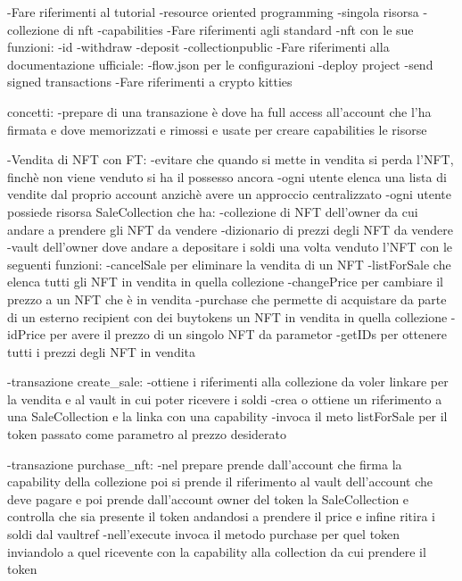 -Fare riferimenti al tutorial
    -resource oriented programming
        -singola risorsa
        -collezione di nft
    -capabilities
-Fare riferimenti agli standard
    -nft con le sue funzioni:
        -id
        -withdraw
        -deposit
        -collectionpublic
-Fare riferimenti alla documentazione ufficiale:
    -flow.json per le configurazioni
    -deploy project
    -send signed transactions
-Fare riferimenti a crypto kitties

concetti:
    -prepare di una transazione è dove ha full access all'account che l'ha firmata e dove 
    memorizzati e rimossi e usate per creare capabilities le risorse

-Vendita di NFT con FT:
    -evitare che quando si mette in vendita si perda l'NFT, finchè non viene venduto si ha il possesso ancora
    -ogni utente elenca una lista di vendite dal proprio account anzichè avere un approccio centralizzato
    -ogni utente possiede risorsa SaleCollection che ha:
        -collezione di NFT dell'owner da cui andare a prendere gli NFT da vendere
        -dizionario di prezzi degli NFT da vendere
        -vault dell'owner dove andare a depositare i soldi una volta venduto l'NFT
        con le seguenti funzioni:
            -cancelSale per eliminare la vendita di un NFT
            -listForSale che elenca tutti gli NFT in vendita in quella collezione
            -changePrice per cambiare il prezzo a un NFT che è in vendita
            -purchase che permette di acquistare da parte di un esterno recipient con dei 
            buytokens un NFT in vendita in quella collezione
            -idPrice per avere il prezzo di un singolo NFT da parametor
            -getIDs per ottenere tutti i prezzi degli NFT in vendita

    -transazione create_sale:
        -ottiene i riferimenti alla collezione da voler linkare per la vendita e al
        vault in cui poter ricevere i soldi
        -crea o ottiene un riferimento a una SaleCollection e la linka con una capability
        -invoca il meto listForSale per il token passato come parametro al prezzo desiderato

    -transazione purchase_nft:
        -nel prepare prende dall'account che firma la capability della collezione
            poi si prende il riferimento al vault dell'account che deve pagare e poi prende dall'account
            owner del token la SaleCollection e controlla che sia presente il token andandosi a prendere 
            il price e infine ritira i soldi dal vaultref
        -nell'execute invoca il metodo purchase per quel token inviandolo a quel ricevente con la capability 
            alla collection da cui prendere il token